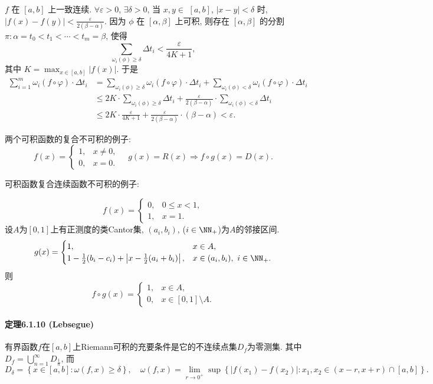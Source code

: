 $f$ 在 $[a,b]$ 上一致连续. $\forall\varepsilon>0$, $\exists\delta>0$,
当 $x,y\in$ $[a,b]$, $|x-y|<\delta$ 时, $|f(x)-f(y)|<\frac{\varepsilon}{2(\beta-\alpha)}$.
因为 $\phi$ 在 $[\alpha,\beta]$ 上可积, 则存在 $[\alpha,\beta]$ 的分割 $\pi:\alpha=t_{0}<t_{1}<\cdots<t_{m}=\beta$,
使得 
\[
\sum_{\omega_{i}(\phi)\geqslant\delta}\Delta t_{i}<\frac{\varepsilon}{4K+1},
\]
其中 $K=\max_{x\in[a,b]}|f(x)|$. 于是 
\[
\begin{aligned}\sum_{i=1}^{m}\omega_{i}(f\circ\varphi)\cdot\Delta t_{i} & =\sum_{\omega_{i}(\phi)\geqslant\delta}\omega_{i}(f\circ\varphi)\cdot\Delta t_{i}+\sum_{\omega_{i}(\phi)<\delta}\omega_{i}(f\circ\varphi)\cdot\Delta t_{i}\\
 & \leqslant2K\cdot\sum_{\omega_{i}(\phi)\geqslant\delta}\Delta t_{i}+\frac{\varepsilon}{2(\beta-\alpha)}\cdot\sum_{\omega_{i}(\phi)<\delta}\Delta t_{i}\\
 & \leqslant2K\cdot\frac{\varepsilon}{4K+1}+\frac{\varepsilon}{2(\beta-\alpha)}\cdot(\beta-\alpha)<\varepsilon.
\end{aligned}
\]

两个可积函数的复合不可积的例子: 
\[
f(x)=\begin{cases}
1, & x\ne0,\\
0, & x=0.
\end{cases}\quad g(x)=R(x)\Longrightarrow f\circ g(x)=D(x).
\]

可积函数复合连续函数不可积的例子:

\[
f(x)=\begin{cases}
0, & 0\le x<1,\\
1, & x=1.
\end{cases}
\]
设$A$为$[0,1]$上有正测度的类Cantor集, $(a_{i},b_{i})$, ($i\in\NN_{+}$)为$A$的邻接区间.
\[
g(x)=\begin{cases}
1, & x\in A,\\
1-\frac{1}{2}(b_{i}-c_{i})+\left|x-\frac{1}{2}(a_{i}+b_{i})\right|, & x\in(a_{i},b_{i}),\ i\in\NN_{+}.
\end{cases}
\]
则
\[
f\circ g(x)=\begin{cases}
1, & x\in A,\\
0, & x\in[0,1]\setminus A.
\end{cases}
\]


\paragraph{定理6.1.10 (Lebsegue)}

有界函数$f$在$[a,b]$上Riemann可积的充要条件是它的不连续点集$D_{f}$为零测集. 其中$D_{f}=\bigcup_{n=1}^{\infty}D_{\frac{1}{n}}$,
而
\[
D_{\delta}=\left\{ x\in[a,b]:\omega(f,x)\ge\delta\right\} ,\quad\omega(f,x)=\lim_{r\rightarrow0^{+}}\sup\left\{ \left|f\left(x_{1}\right)-f\left(x_{2}\right)\right|:x_{1},x_{2}\in(x-r,x+r)\cap[a,b]\right\} .
\]


